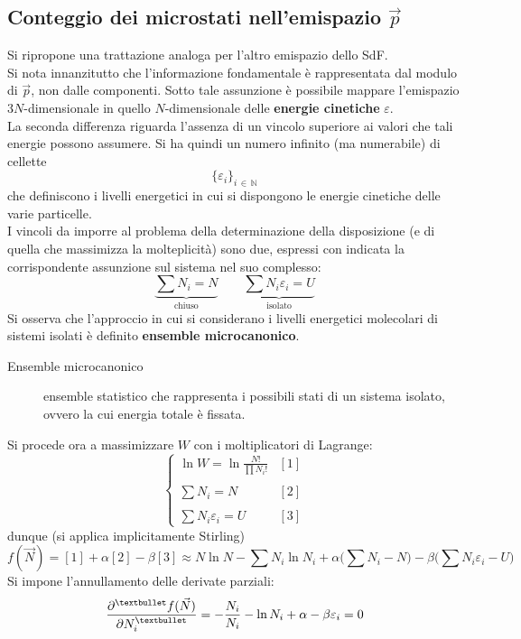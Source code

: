 \documentclass[10pt, oneside]{book}
\newcommand{\ds}{\displaystyle}
\newcommand{\setel}[1]{ \{ #1\} }
\begin{document}
\subsection{Conteggio dei microstati nell'emispazio $\vec{p}$}
Si ripropone una trattazione analoga per l'altro emispazio dello SdF.\\
Si nota innanzitutto che l'informazione fondamentale è rappresentata dal modulo di $\vec{p}$, non dalle componenti. Sotto tale assunzione è possibile mappare l'emispazio $3N$-dimensionale in quello $N$-dimensionale delle \textbf{energie cinetiche} $\varepsilon$.\\
La seconda differenza riguarda l'assenza di un vincolo superiore ai valori che tali energie possono assumere. Si ha quindi un numero infinito (ma numerabile) di cellette 
\[\setel{\varepsilon_i}_{i \, \in \, \mathbb{N}}\]
che definiscono i livelli energetici in cui si dispongono le energie cinetiche delle varie particelle.\\
I vincoli da imporre al problema della determinazione della disposizione (e di quella che massimizza la molteplicità) sono due, espressi con indicata la corrispondente assunzione sul sistema nel suo complesso:
\[\underbrace{\sum N_i = N}_{\textrm{chiuso}} \qquad \underbrace{\sum N_i \varepsilon_i = U}_{\textrm{isolato}}\]
Si osserva che l'approccio in cui si considerano i livelli energetici molecolari di sistemi isolati è definito \textbf{ensemble microcanonico}.\\
\begin{description}
\item[Ensemble microcanonico] ensemble statistico che rappresenta i possibili stati di un sistema isolato, ovvero la cui energia totale è fissata.
\end{description}
Si procede ora a massimizzare $W$ con i moltiplicatori di Lagrange:
\[\begin{cases} \displaystyle \ln W = \ln \frac{N!}{\prod N_i !} & [1]\\ \\ \displaystyle \sum N_i = N & [2] \\ \\ \ds \sum N_i \varepsilon_i = U & [3]
\end{cases}\]
dunque (si applica implicitamente Stirling)
\[f(\vec{N}) = [1] + \alpha [2] - \beta [3] \approx N \ln N - \sum N_i \ln N_i + \alpha \big(\sum N_i - N\big) - \beta \big(\sum N_i \varepsilon_i - U\big)\]
Si impone l'annullamento delle derivate parziali:
\[\pdv[•]{f(\vec{N})}{N_i} = - \frac{N_i}{N_i} - \ln N_i + \alpha - \beta \varepsilon_i = 0\]
\end{document}
